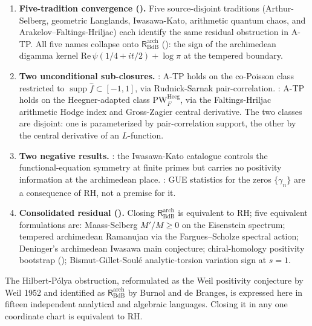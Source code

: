 \begin{enumerate}
\item \textbf{Five-tradition convergence
().} Five source-disjoint
traditions (Arthur-Selberg, geometric Langlands, Iwasawa-Kato,
arithmetic quantum chaos, and Arakelov--Faltings-Hriljac) each
identify the same residual obstruction in A-TP. All five names
collapse onto \(\mathsf{R}^{\mathrm{arch}}_{\mathrm{BdB}}\)
(): the sign of the
archimedean digamma kernel
\(\mathrm{Re}\,\psi(1/4+it/2)+\log\pi\) at the tempered boundary.

\item \textbf{Two unconditional sub-closures.}
: A-TP holds on the
co-Poisson class restricted to \(\operatorname{supp}\hat f\subset[-1,1]\),
via Rudnick-Sarnak pair-correlation.
: A-TP holds on the
Heegner-adapted class \(\mathrm{PW}^{\mathrm{Heeg}}_F\), via the
Faltings-Hriljac arithmetic Hodge index and Gross-Zagier central
derivative. The two classes are disjoint: one is parameterized by
pair-correlation support, the other by the central derivative of
an \(L\)-function.

\item \textbf{Two negative results.}
: the Iwasawa-Kato
catalogue controls the functional-equation symmetry at finite primes
but carries no positivity information at the archimedean place.
: GUE statistics for the
zeros \(\{\gamma_n\}\) are a consequence of RH, not a premise for it.

\item \textbf{Consolidated residual
().}
Closing \(\mathsf{R}^{\mathrm{arch}}_{\mathrm{BdB}}\) is equivalent to
RH; five equivalent formulations are: Maass-Selberg \(M'/M \geq 0\)
on the Eisenstein spectrum; tempered archimedean Ramanujan via the
Fargues--Scholze spectral action; Deninger's archimedean Iwasawa main
conjecture; chiral-homology positivity bootstrap
(); Bismut-Gillet-Soul\'{e}
analytic-torsion variation sign at \(s=1\).
\end{enumerate}

The Hilbert-P\'{o}lya obstruction, reformulated as the Weil positivity
conjecture by Weil 1952 and identified as
\(\mathsf{R}^{\mathrm{arch}}_{\mathrm{BdB}}\) by Burnol and de
Branges, is expressed here in fifteen independent analytical and
algebraic languages. Closing it in any one coordinate chart is
equivalent to RH.
